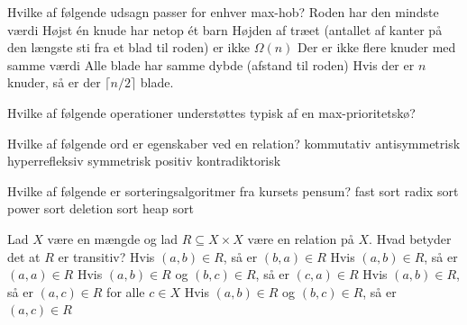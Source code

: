 Hvilke af følgende udsagn passer for enhver max-hob?
\fleresvar
\mulighederstart
\svar Roden har den mindste værdi
\svar Højst én knude har netop ét barn \korrekt
\svar Højden af træet (antallet af kanter på den længste sti fra et blad til roden) er  ikke $\Omega(n)$ \korrekt
\svar Der er ikke flere knuder med samme værdi
\svar Alle blade har samme dybde (afstand til roden)
\svar Hvis der er $n$ knuder, så er der $\lceil n/2\rceil$ blade. \korrekt
\mulighederslut
{}

Hvilke af følgende operationer understøttes typisk af en max-prioritetskø?
\fleresvar
\mulighederstart
\svar {}
\svar {}
\svar {}
\svar {} \korrekt
\svar {} \korrekt
\mulighederslut
{}

Hvilke af følgende ord er egenskaber ved en relation?
\fleresvar
\mulighederstart
\svar kommutativ
\svar antisymmetrisk \korrekt
\svar hyperrefleksiv
\svar symmetrisk \korrekt
\svar positiv
\svar kontradiktorisk
\mulighederslut
{}

Hvilke af følgende er sorteringsalgoritmer fra kursets pensum?
\fleresvar
\mulighederstart
\svar fast sort
\svar radix sort \korrekt
\svar power sort
\svar deletion sort
\svar heap sort \korrekt
\mulighederslut
{}

Lad $X$ være en mængde og lad $R \subseteq X \times X$ være en relation på $X$.
Hvad betyder det at $R$ er transitiv?
\etsvar
\mulighederstart
\svar Hvis $(a,b) \in R$, så er $(b,a) \in R$
\svar Hvis $(a,b) \in R$, så er $(a,a) \in R$
\svar Hvis $(a,b) \in R$ og $(b,c) \in R$, så er $(c,a) \in R$
\svar Hvis $(a,b) \in R$, så er $(a,c) \in R$ for alle $c \in X$
\svar Hvis $(a,b) \in R$ og $(b,c) \in R$, så er $(a,c) \in R$ \korrekt
\mulighederslut
{}


